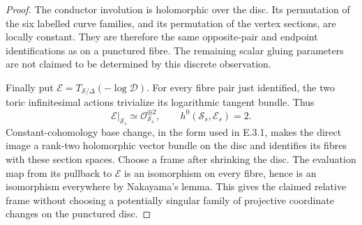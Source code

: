 \begin{proof}
The conductor involution is holomorphic
over the disc.  Its permutation of the
six labelled curve families, and its
permutation of the vertex sections,
are locally constant.  They are therefore
the same opposite-pair and endpoint
identifications as on a punctured fibre.
The remaining scalar gluing parameters
are not claimed to be determined by
this discrete observation.

Finally put
$\mathcal E=T_{\mathcal S/\Delta}(-\log\mathcal D)$.
For every fibre pair just identified,
the two toric infinitesimal actions
trivialize its logarithmic tangent
bundle.  Thus
\[
 \mathcal E|_{\mathcal S_s}\simeq
 \mathcal O_{\mathcal S_s}^{\oplus2},
 \qquad h^0(\mathcal S_s,\mathcal E_s)=2.
\]
Constant-cohomology base change, in the
form used in E.3.1, makes the direct
image a rank-two holomorphic vector
bundle on the disc and identifies its
fibres with these section spaces.
Choose a frame after shrinking the
disc.  The evaluation map from its
pullback to $\mathcal E$ is an
isomorphism on every fibre, hence
is an isomorphism everywhere by
Nakayama's lemma.  This gives the
claimed relative frame without
choosing a potentially singular
family of projective coordinate
changes on the punctured disc.
\end{proof}
